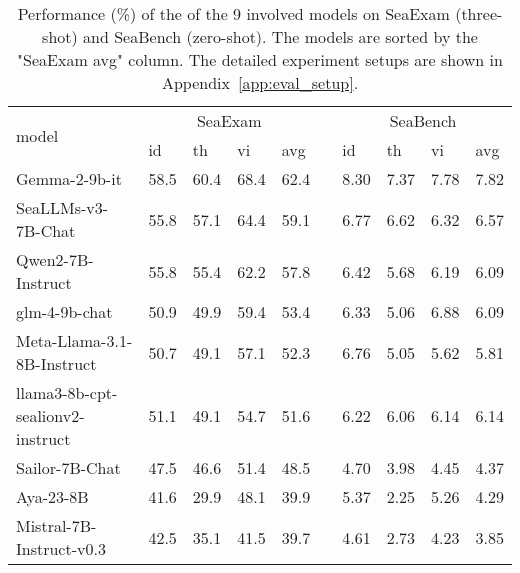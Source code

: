 \begin{table*}[t]
    \centering
    \small
    \begin{tabular}{llllllllll}
        \toprule
         \multirow{2}{*}{model}& \multicolumn{4}{c}{SeaExam} & & \multicolumn{4}{c}{SeaBench} \\ 
         \cmidrule{2-5} \cmidrule{7-10}
        & id & th & vi & avg  & & id & th & vi & avg \\ 
        \midrule
        Gemma-2-9b-it & 58.5 & 60.4 & 68.4 & 62.4 & & 8.30 & 7.37 & 7.78 & 7.82 \\ 
        SeaLLMs-v3-7B-Chat & 55.8 & 57.1 & 64.4 & 59.1 & & 6.77 & 6.62 & 6.32 & 6.57 \\ 
        Qwen2-7B-Instruct & 55.8 & 55.4 & 62.2 & 57.8 & & 6.42 & 5.68 & 6.19 & 6.09 \\ 
        glm-4-9b-chat & 50.9 & 49.9 & 59.4 & 53.4 & & 6.33 & 5.06 & 6.88 & 6.09 \\ 
        Meta-Llama-3.1-8B-Instruct & 50.7 & 49.1 & 57.1 & 52.3 & & 6.76 & 5.05 & 5.62 & 5.81 \\ 
        llama3-8b-cpt-sealionv2-instruct & 51.1 & 49.1 & 54.7 & 51.6 & & 6.22 & 6.06 & 6.14 & 6.14 \\ 
        Sailor-7B-Chat & 47.5 & 46.6 & 51.4 & 48.5 & & 4.70 & 3.98 & 4.45 & 4.37 \\ 
        Aya-23-8B & 41.6 & 29.9 & 48.1 & 39.9 & & 5.37 & 2.25 & 5.26 & 4.29 \\ 
        Mistral-7B-Instruct-v0.3 & 42.5 & 35.1 & 41.5 & 39.7 & & 4.61 & 2.73 & 4.23 & 3.85 \\ 
        \bottomrule
    \end{tabular}
    \caption{Performance (\%) of the of the 9 involved models on SeaExam (three-shot) and SeaBench (zero-shot). The models are sorted by the "SeaExam avg" column. The detailed experiment setups are shown in Appendix~\ref{app:eval_setup}.}
    \label{tab:main_results}
\end{table*}

